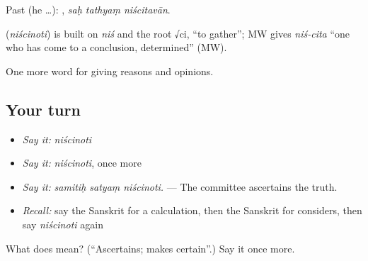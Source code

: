 Past (he …):   , \emph{saḥ tathyaṃ niścitavān}.

\begin{cousinweb}
\textbf{} (\emph{niścinoti}) is built on \emph{niś} and the root √ci, \textquotedblleft{}to gather\textquotedblright{}; MW gives \emph{niś-cita} \textquotedblleft{}one who has come to a conclusion, determined\textquotedblright{} (MW).
\end{cousinweb}

\begin{grammarlens}[title={What you've built}]
One more word for giving reasons and opinions.
\end{grammarlens}

\subsection*{Your turn}
\begin{itemize}
\raggedright
  \item \emph{Say it:} \emph{niścinoti}
  \item \emph{Say it:} \emph{niścinoti}, once more
  \item \emph{Say it:} \emph{samitiḥ satyaṃ niścinoti.} — The committee ascertains the truth.
  \item \emph{Recall:} say the Sanskrit for a calculation, then the Sanskrit for considers, then say \emph{niścinoti} again
\end{itemize}

\begin{tcolorbox}[breakable,colback=teal!4,colframe=teal!35!black,title={Before you move on}]
What does  mean? (\textquotedblleft{}Ascertains; makes certain\textquotedblright{}.) Say it once more.
\end{tcolorbox}
